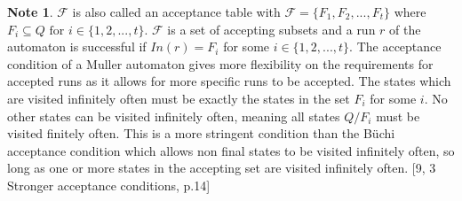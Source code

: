 \documentclass[a4paper,12pt]{report}
\theoremstyle{definition}
\newtheorem{note}{Note}[subsection]
\begin{document}
\begin{note}
$\mathcal{F}$ is also called an acceptance table with $\mathcal{F}=\{F_1,F_2,...,F_t\}$ where $F_i \subseteq Q \text{ for } i\in\{1,2,...,t\}$. $\mathcal{F}$ is a set of accepting subsets and a run $r$ of the automaton is successful if $In(r)=F_i$ for some $i\in\{1,2,...,t\}$. The acceptance condition of a Muller automaton gives more flexibility on the requirements for accepted runs as it allows for more specific runs to be accepted. The states which are visited infinitely often must be exactly the states in the set $F_i$ for some $i$. No other states can be visited infinitely often, meaning all states $Q/F_i$ must be visited finitely often. This is a more stringent condition than the Büchi acceptance condition which allows non final states to be visited infinitely often, so long as one or more states in the accepting set are visited infinitely often. 
[9, 3 Stronger acceptance conditions, p.14]
\end{note}
\end{document}
